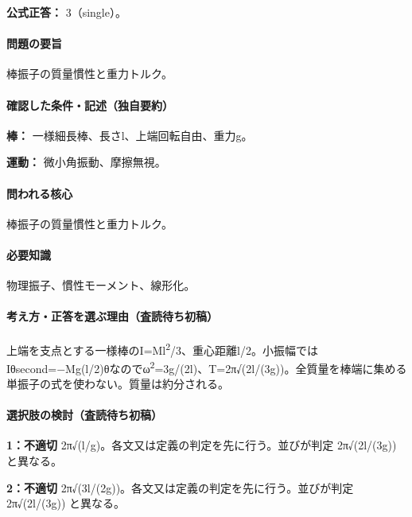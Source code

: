 \textbf{公式正答：} 3（single）。

\paragraph{問題の要旨} 棒振子の質量慣性と重力トルク。

\paragraph{確認した条件・記述（独自要約）}\mbox{}\par

\noindent\textbf{棒：} 一様細長棒、長さl、上端回転自由、重力g。\par

\noindent\textbf{運動：} 微小角振動、摩擦無視。\par

\paragraph{問われる核心} 棒振子の質量慣性と重力トルク。

\paragraph{必要知識} 物理振子、慣性モーメント、線形化。

\paragraph{考え方・正答を選ぶ理由（査読待ち初稿）} 上端を支点とする一様棒のI=\allowbreak{}Ml\textsuperscript{2}/3、重心距離l/2。小振幅ではIθsecond=−Mg(l/2)θなのでω\textsuperscript{2}=3g/(2l)、T=\allowbreak{}2π√(2l/(3g))。全質量を棒端に集める単振子の式を使わない。質量は約分される。

\paragraph{選択肢の検討（査読待ち初稿）}\mbox{}\par

\noindent\textbf{1：不適切} 2π√(l/g)。各文又は定義の判定を先に行う。並びが判定 2π√(2l/(3g)) と異なる。\par

\noindent\textbf{2：不適切} 2π√(3l/(2g))。各文又は定義の判定を先に行う。並びが判定 2π√(2l/(3g)) と異なる。\par

